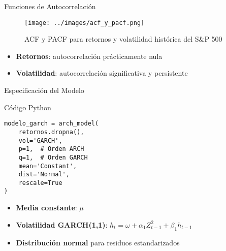 \begin{frame}{Funciones de Autocorrelación}
    \begin{figure}
        \centering
        \texttt{[image: ../images/acf\_y\_pacf.png]}
        \caption{ACF y PACF para retornos y volatilidad histórica del S\&P 500}
    \end{figure}
    
    \vspace{0.5em}
    
    \begin{itemize}
        \item<2-> \textbf{Retornos}: autocorrelación prácticamente nula
        \item<3-> \textbf{Volatilidad}: autocorrelación significativa y persistente
    \end{itemize}
\end{frame}

\begin{frame}[fragile]{Especificación del Modelo}
    \begin{block}{Código Python}
        \begin{verbatim}
modelo_garch = arch_model(
    retornos.dropna(),
    vol='GARCH',
    p=1,  # Orden ARCH
    q=1,  # Orden GARCH
    mean='Constant',
    dist='Normal',
    rescale=True
)
        \end{verbatim}
    \end{block}
    
    \vspace{0.5em}
    
    \begin{itemize}
        \item<2-> \textbf{Media constante}: $\mu$
        \item<3-> \textbf{Volatilidad GARCH(1,1)}: $h_t = \omega + \alpha_1 Z_{t-1}^2 + \beta_1 h_{t-1}$
        \item<4-> \textbf{Distribución normal} para residuos estandarizados
    \end{itemize}
\end{frame}

